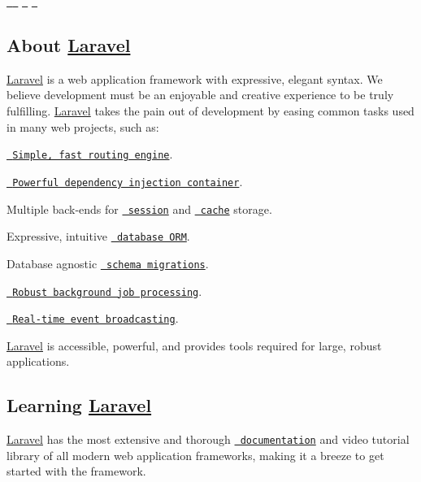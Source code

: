 

\href{https://travis-ci.org/laravel/framework}{\texttt{ }} \href{https://packagist.org/packages/laravel/framework}{\texttt{ }} \href{https://packagist.org/packages/laravel/framework}{\texttt{ }} \href{https://packagist.org/packages/laravel/framework}{\texttt{ }} 

\subsection*{About \mbox{\hyperlink{namespaceLaravel}{Laravel}}}

\mbox{\hyperlink{namespaceLaravel}{Laravel}} is a web application framework with expressive, elegant syntax. We believe development must be an enjoyable and creative experience to be truly fulfilling. \mbox{\hyperlink{namespaceLaravel}{Laravel}} takes the pain out of development by easing common tasks used in many web projects, such as\+:


\begin{DoxyItemize}
\item \href{https://laravel.com/docs/routing}{\texttt{ Simple, fast routing engine}}.
\item \href{https://laravel.com/docs/container}{\texttt{ Powerful dependency injection container}}.
\item Multiple back-\/ends for \href{https://laravel.com/docs/session}{\texttt{ session}} and \href{https://laravel.com/docs/cache}{\texttt{ cache}} storage.
\item Expressive, intuitive \href{https://laravel.com/docs/eloquent}{\texttt{ database O\+RM}}.
\item Database agnostic \href{https://laravel.com/docs/migrations}{\texttt{ schema migrations}}.
\item \href{https://laravel.com/docs/queues}{\texttt{ Robust background job processing}}.
\item \href{https://laravel.com/docs/broadcasting}{\texttt{ Real-\/time event broadcasting}}.
\end{DoxyItemize}

\mbox{\hyperlink{namespaceLaravel}{Laravel}} is accessible, powerful, and provides tools required for large, robust applications.

\subsection*{Learning \mbox{\hyperlink{namespaceLaravel}{Laravel}}}

\mbox{\hyperlink{namespaceLaravel}{Laravel}} has the most extensive and thorough \href{https://laravel.com/docs}{\texttt{ documentation}} and video tutorial library of all modern web application frameworks, making it a breeze to get started with the framework.

